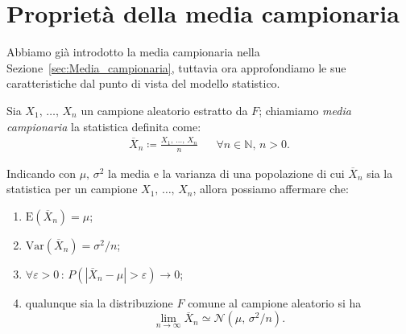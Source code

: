     \section{Proprietà della media campionaria}
    \begin{note}
        Abbiamo già introdotto la media campionaria nella Sezione~\ref{sec:Media_campionaria}, tuttavia 
        ora approfondiamo le sue caratteristiche dal punto di vista del modello statistico.
    \end{note}
        \begin{defn}
            Sia $X_1,\, \ldots,\, X_{n}$ un campione aleatorio estratto da $F$; chiamiamo 
            \emph{media campionaria} la statistica definita come:
            \begin{align}\label{eq:Media_campionaria_statistica}
                \overline{X}_n \coloneqq \frac{X_1,\, \ldots,\, X_{n}}{n} & & \forall n \in \mathbb{N},\, n > 0
            .\end{align}
        \end{defn}
        \begin{prty}
            Indicando con $\mu,\, \sigma^2$ la media e la varianza di una popolazione di cui $\overline{X}_n$ 
            sia la statistica per un campione $X_1,\, \ldots,\, X_{n}$, allora possiamo affermare che:
            \begin{enumerate}
                \item $\text{E}(\overline{X}_n) = \mu$;
                \item $\text{Var}(\overline{X}_n) = \sigma^2 /n$;
                \item $\forall \varepsilon > 0 \,:\, P\left(|\overline{X}_n - \mu| > \varepsilon\right) 
                    \rightarrow 0$;
                \item qualunque sia la distribuzione $F$ comune al campione aleatorio si ha \[
                    \lim_{n \to \infty} \overline{X}_n \simeq \mathcal{N}(\mu,\, \sigma^2 /n)
                .\]
            \end{enumerate}
        \end{prty}
